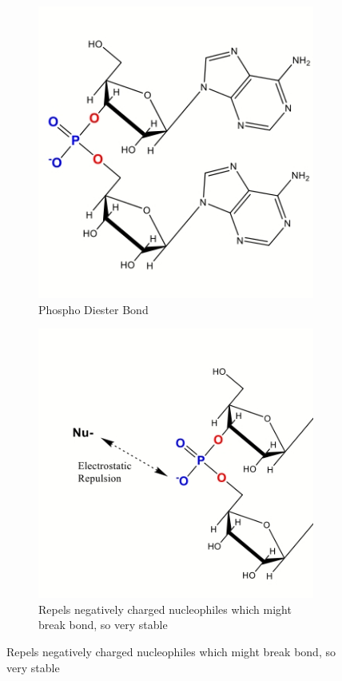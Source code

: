 \documentclass[]{article}
\begin{document}
\begin{figure}[H]
	\caption{Nucleic Acid Backbones}
	\label{fig:three graphs}
	\begin{subfigure}[b]{0.45\textwidth}
		\centering
		\caption{Phospho Diester Bond}\label{fig:PhosphoDiesterBond} 
		\includegraphics[width=\textwidth]{PhosphoDiesterBond}
	\end{subfigure}
	\begin{subfigure}[b]{0.45\textwidth}
		\centering
		\caption{Repels negatively charged nucleophiles which might break bond, so very stable}\label{fig:PhosphoDiesterBond1} 
		\includegraphics[width=\textwidth]{PhosphoDiesterBond1}

\end{subfigure}
\end{figure}
\end{document}
